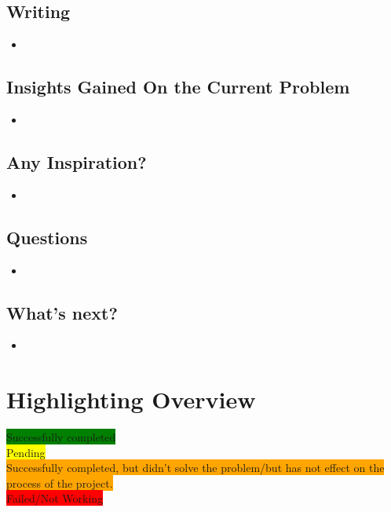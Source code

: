 \documentclass{article}
\begin{document}
\subsection{Writing}
\begin{itemize}
\item 
\end{itemize}
\subsection{Insights Gained On the Current Problem}
\begin{itemize}
\item 
\end{itemize}
\subsection{Any Inspiration?}
\begin{itemize}
\item 
\end{itemize}
\subsection{Questions}
\begin{itemize}
\item 
\end{itemize}
\subsection{What's next?}
\begin{itemize}
\item
\end{itemize}
\newpage
\fi

\section{Highlighting Overview}

\colorbox{green}{Successfully completed}\\
\colorbox{yellow}{Pending}\\
\colorbox{orange}{Successfully completed, but didn't solve the problem/but has not effect on the process of the project.}\\
\colorbox{red}{Failed/Not Working}\\
\newpage





\end{document}
